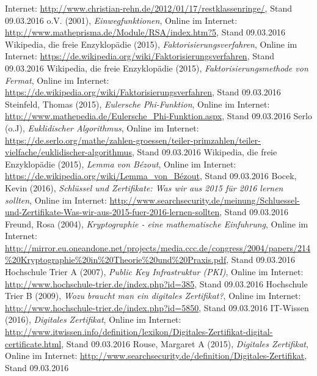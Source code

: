 \documentclass[a4paper, fontsize=12pt, parskip=full, toc=bibliographynumbered]{scrreprt}
\begin{document}
\begin{thebibliography}{9}
  Internet: \url{http://www.christian-rehn.de/2012/01/17/restklassenringe/}, Stand 09.03.2016
 o.V. (2001), \emph{Einwegfunktionen}, Online im Internet: \url{http://www.matheprisma.de/Module/RSA/index.htm?5}, Stand 09.03.2016
 Wikipedia, die freie Enzyklopädie (2015), \emph{Faktorisierungsverfahren}, Online im Internet: \url{https://de.wikipedia.org/wiki/Faktorisierungsverfahren}, Stand 09.03.2016
 Wikipedia, die freie Enzyklopädie (2015), \emph{Faktorisierungsmethode von Fermat}, Online im Internet: \url{https://de.wikipedia.org/wiki/Faktorisierungsverfahren}, Stand 09.03.2016
 Steinfeld, Thomas (2015), \emph{Eulersche Phi-Funktion}, Online im Internet: \url{http://www.mathepedia.de/Eulersche_Phi-Funktion.aspx}, Stand 09.03.2016
 Serlo (o.J), \emph{Euklidischer Algorithmus}, Online im Internet: \url{https://de.serlo.org/mathe/zahlen-groessen/teiler-primzahlen/teiler-vielfache/euklidischer-algorithmus}, Stand 09.03.2016
 Wikipedia, die freie Enzyklopädie (2015), \emph{Lemma von Bézout}, Online im Internet: \url{https://de.wikipedia.org/wiki/Lemma_von_Bézout}, Stand 09.03.2016
 Bocek, Kevin (2016), \emph{Schlüssel und Zertifikate: Was wir aus 2015 für 2016 lernen sollten}, Online im Internet: \url{http://www.searchsecurity.de/meinung/Schluessel-und-Zertifikate-Was-wir-aus-2015-fuer-2016-lernen-sollten}, Stand 09.03.2016
 Freund, Rosa (2004), \emph{Kryptographie - eine mathematische Einfuhrung}, Online im Internet: \url{http://mirror.eu.oneandone.net/projects/media.ccc.de/congress/2004/papers/214\%20Kryptographie\%20in\%20Theorie\%20und\%20Praxis.pdf}, Stand 09.03.2016
 Hochschule Trier A (2007), \emph{Public Key Infrastruktur (PKI)}, Online im Internet: \url{http://www.hochschule-trier.de/index.php?id=385}, Stand 09.03.2016
 Hochschule Trier B (2009), \emph{Wozu braucht man ein digitales Zertifikat?}, Online im Internet: \url{http://www.hochschule-trier.de/index.php?id=5850}, Stand 09.03.2016
 IT-Wissen (2016), \emph{Digitales Zertifikat}, Online im Internet: \url{http://www.itwissen.info/definition/lexikon/Digitales-Zertifikat-digital-certificate.html}, Stand 09.03.2016
 Rouse, Margaret A (2015), \emph{Digitales Zertifikat}, Online im Internet: \url{http://www.searchsecurity.de/definition/Digitales-Zertifikat}, Stand 09.03.2016

\end{thebibliography}
\end{document}
